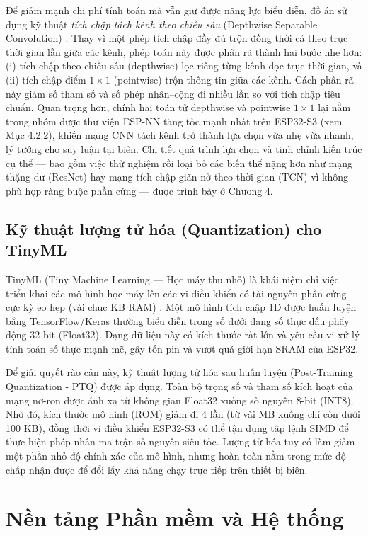 \documentclass[../DoAn.tex]{subfiles}
\begin{document}
Để giảm mạnh chi phí tính toán mà vẫn giữ được năng lực biểu diễn, đồ án sử dụng kỹ thuật \textit{tích chập tách kênh theo chiều sâu} (Depthwise Separable Convolution) \cite{howard2017mobilenets}. Thay vì một phép tích chập đầy đủ trộn đồng thời cả theo trục thời gian lẫn giữa các kênh, phép toán này được phân rã thành hai bước nhẹ hơn: (i) tích chập theo chiều sâu (depthwise) lọc riêng từng kênh dọc trục thời gian, và (ii) tích chập điểm $1\times1$ (pointwise) trộn thông tin giữa các kênh. Cách phân rã này giảm số tham số và số phép nhân--cộng đi nhiều lần so với tích chập tiêu chuẩn. Quan trọng hơn, chính hai toán tử depthwise và pointwise $1\times1$ lại nằm trong nhóm được thư viện ESP-NN tăng tốc mạnh nhất trên ESP32-S3 (xem Mục 4.2.2), khiến mạng CNN tách kênh trở thành lựa chọn vừa nhẹ vừa nhanh, lý tưởng cho suy luận tại biên. Chi tiết quá trình lựa chọn và tinh chỉnh kiến trúc cụ thể --- bao gồm việc thử nghiệm rồi loại bỏ các biến thể nặng hơn như mạng thặng dư (ResNet) hay mạng tích chập giãn nở theo thời gian (TCN) vì không phù hợp ràng buộc phần cứng --- được trình bày ở Chương 4.

\subsection{Kỹ thuật lượng tử hóa (Quantization) cho TinyML}
TinyML (Tiny Machine Learning --- Học máy thu nhỏ) là khái niệm chỉ việc triển khai các mô hình học máy lên các vi điều khiển có tài nguyên phần cứng cực kỳ eo hẹp (vài chục KB RAM) \cite{warden2019tinyml}. Một mô hình tích chập 1D được huấn luyện bằng TensorFlow/Keras thường biểu diễn trọng số dưới dạng số thực dấu phẩy động 32-bit (Float32). Dạng dữ liệu này có kích thước rất lớn và yêu cầu vi xử lý tính toán số thực mạnh mẽ, gây tốn pin và vượt quá giới hạn SRAM của ESP32.

Để giải quyết rào cản này, kỹ thuật lượng tử hóa sau huấn luyện (Post-Training Quantization - PTQ) được áp dụng. Toàn bộ trọng số và tham số kích hoạt của mạng nơ-ron được ánh xạ từ không gian Float32 xuống số nguyên 8-bit (INT8). Nhờ đó, kích thước mô hình (ROM) giảm đi 4 lần (từ vài MB xuống chỉ còn dưới 100 KB), đồng thời vi điều khiển ESP32-S3 có thể tận dụng tập lệnh SIMD để thực hiện phép nhân ma trận số nguyên siêu tốc. Lượng tử hóa tuy có làm giảm một phần nhỏ độ chính xác của mô hình, nhưng hoàn toàn nằm trong mức độ chấp nhận được để đổi lấy khả năng chạy trực tiếp trên thiết bị biên.

\section{Nền tảng Phần mềm và Hệ thống}
\label{section:3.4}
\end{document}
